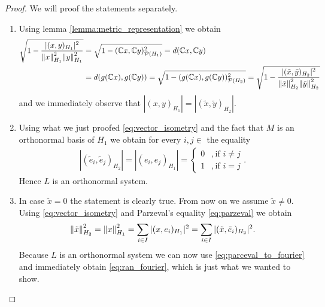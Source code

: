 \begin{proof}
	We will proof the statements separately.
	\begin{enumerate}
		\item Using lemma \ref{lemma:metric_representation} we obtain
		\begin{align*}
			\sqrt{1 - \dfrac{|(x,y)_{H_1}|^2}{\norm[H_1]{x}^2 \norm[H_1]{y}^2}} &= \sqrt{1 - (\C x,\C y)_{\mathcal{P}(H_1)}^2} = d(\C x,\C y) \\
			&= d\pbraces{g(\C x), g(\C y)} = \sqrt{1 - (g(\C x), g(\C y))_{\mathcal{P}(H_2)}^2} = \sqrt{1 - \dfrac{|(\tilde{x}, \tilde{y})_{H_2}|^2}{\norm[H_2]{\tilde{x}}^2 \norm[H_2]{\tilde{y}}^2}}
		\end{align*}
		and we immediately observe that $|(x,y)_{H_1}| = |(\tilde{x},\tilde{y})_{H_2}|$. 
		
		\item Using what we just proofed \eqref{eq:vector_isometry} and the fact that $M$ is an orthonormal basis of $H_1$ we obtain for every $i,j \in $ the equality
		\begin{align*}
			|(\tilde{e}_i, \tilde{e}_j)_{H_2}| = |(e_i, e_j)_{H_1}| = 
			\begin{cases}
				0 &, \text{if } i \neq j \\
				1 &, \text{if } i = j
			\end{cases}.
		\end{align*}
		Hence $L$ is an orthonormal system.
		
		\item In case $\tilde{x} = 0$ the statement is clearly true. From now on we assume $\tilde{x} \neq 0$. Using \eqref{eq:vector_isometry} and Parzeval's equality \eqref{eq:parzeval} we obtain
		\begin{align*}
			\norm[H_2]{\tilde{x}}^2 = \norm[H_1]{x}^2 = \sum_{i \in I} |(x, e_i)_{H_1}|^2 = \sum_{i \in I} |(\tilde{x}, \tilde{e}_i)_{H_2}|^2.
		\end{align*}
		Because $L$ is an orthonormal system we can now use \eqref{eq:parceval_to_fourier} and immediately obtain \eqref{eq:ran_fourier}, which is just what we wanted to show.
	\end{enumerate}
\end{proof}